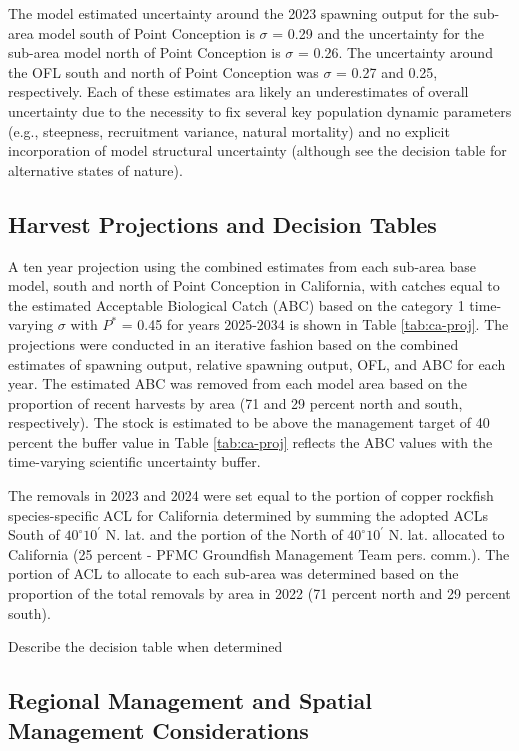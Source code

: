 \documentclass[11pt,
  english,
  letterpaper,
]{article}
\begin{document}
The model estimated uncertainty around the 2023 spawning output for the sub-area model south of Point Conception is \(\sigma\) = 0.29 and the uncertainty for the sub-area model north of Point Conception is \(\sigma\) = 0.26. The uncertainty around the OFL south and north of Point Conception was \(\sigma\) = 0.27 and 0.25, respectively. Each of these estimates ara likely an underestimates of overall uncertainty due to the necessity to fix several key population dynamic parameters (e.g., steepness, recruitment variance, natural mortality) and no explicit incorporation of model structural uncertainty (although see the decision table for alternative states of nature).

\hypertarget{harvest-projections-and-decision-tables}{%
\subsection{Harvest Projections and Decision Tables}\label{harvest-projections-and-decision-tables}}

A ten year projection using the combined estimates from each sub-area base model, south and north of Point Conception in California, with catches equal to the estimated Acceptable Biological Catch (ABC) based on the category 1 time-varying \(\sigma\) with \(P^*\) = 0.45 for years 2025-2034 is shown in Table \ref{tab:ca-proj}. The projections were conducted in an iterative fashion based on the combined estimates of spawning output, relative spawning output, OFL, and ABC for each year. The estimated ABC was removed from each model area based on the proportion of recent harvests by area (71 and 29 percent north and south, respectively). The stock is estimated to be above the management target of 40 percent the buffer value in Table \ref{tab:ca-proj} reflects the ABC values with the time-varying scientific uncertainty buffer.

The removals in 2023 and 2024 were set equal to the portion of copper rockfish species-specific ACL for California determined by summing the adopted ACLs South of $40^\circ 10^\prime$ N. lat. and the portion of the North of $40^\circ 10^\prime$ N. lat. allocated to California (25 percent - PFMC Groundfish Management Team pers. comm.). The portion of ACL to allocate to each sub-area was determined based on the proportion of the total removals by area in 2022 (71 percent north and 29 percent south).

Describe the decision table when determined

\hypertarget{regional-management-and-spatial-management-considerations}{%
\subsection{Regional Management and Spatial Management Considerations}\label{regional-management-and-spatial-management-considerations}}
\end{document}
